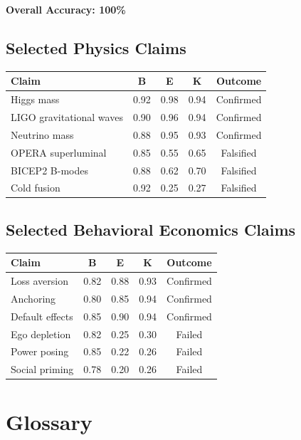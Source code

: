 \documentclass[11pt,a4paper]{article}
\begin{document}
\textbf{Overall Accuracy: 100\%}

\subsection{Selected Physics Claims}

\begin{center}
\begin{tabular}{lcccc}
\toprule
\textbf{Claim} & \textbf{B} & \textbf{E} & \textbf{K} & \textbf{Outcome} \\
\midrule
Higgs mass & 0.92 & 0.98 & 0.94 & Confirmed \\
LIGO gravitational waves & 0.90 & 0.96 & 0.94 & Confirmed \\
Neutrino mass & 0.88 & 0.95 & 0.93 & Confirmed \\
OPERA superluminal & 0.85 & 0.55 & 0.65 & Falsified \\
BICEP2 B-modes & 0.88 & 0.62 & 0.70 & Falsified \\
Cold fusion & 0.92 & 0.25 & 0.27 & Falsified \\
\bottomrule
\end{tabular}
\end{center}

\subsection{Selected Behavioral Economics Claims}

\begin{center}
\begin{tabular}{lcccc}
\toprule
\textbf{Claim} & \textbf{B} & \textbf{E} & \textbf{K} & \textbf{Outcome} \\
\midrule
Loss aversion & 0.82 & 0.88 & 0.93 & Confirmed \\
Anchoring & 0.80 & 0.85 & 0.94 & Confirmed \\
Default effects & 0.85 & 0.90 & 0.94 & Confirmed \\
Ego depletion & 0.82 & 0.25 & 0.30 & Failed \\
Power posing & 0.85 & 0.22 & 0.26 & Failed \\
Social priming & 0.78 & 0.20 & 0.26 & Failed \\
\bottomrule
\end{tabular}
\end{center}

\newpage
\section{Glossary}
\end{document}
